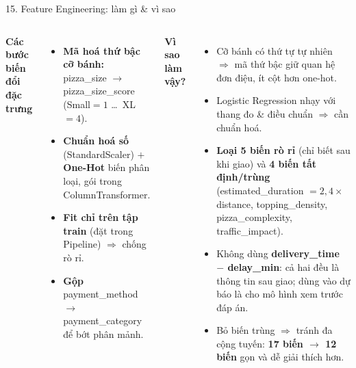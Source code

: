 \documentclass[t, aspectratio=169, 11pt]{beamer}
\newcommand{\blk}[1]{\textbf{\color{hustprimary}#1}}
\begin{document}
\begin{frame}{15. Feature Engineering: làm gì \& vì sao}
    \begin{columns}[T]
        \blk{Các bước biến đổi đặc trưng}
        \begin{itemize}\footnotesize
            \item \textbf{Mã hoá thứ bậc cỡ bánh:} pizza\_size $\to$ pizza\_size\_score (Small$=1$ \dots\ XL$=4$).
            \item \textbf{Chuẩn hoá số} (StandardScaler) $+$ \textbf{One-Hot} biến phân loại, gói trong ColumnTransformer.
            \item \textbf{Fit chỉ trên tập train} (đặt trong Pipeline) $\Rightarrow$ chống rò rỉ.
            \item \textbf{Gộp} payment\_method $\to$ payment\_category để bớt phân mảnh.
        \end{itemize}

        \blk{Vì sao làm vậy?}
        \begin{itemize}\footnotesize
            \item Cỡ bánh có thứ tự tự nhiên $\Rightarrow$ mã thứ bậc giữ quan hệ đơn điệu, ít cột hơn one-hot.
            \item Logistic Regression nhạy với thang đo \& điều chuẩn $\Rightarrow$ cần chuẩn hoá.
            \item \textbf{Loại 5 biến rò rỉ} (chỉ biết sau khi giao) và \textbf{4 biến tất định/trùng} (estimated\_duration $=2{,}4\times$distance, topping\_density, pizza\_complexity, traffic\_impact).
            \item Không dùng \textbf{delivery\_time $-$ delay\_min}: cả hai đều là thông tin sau giao; dùng vào dự báo là cho mô hình xem trước đáp án.
            \item Bỏ biến trùng $\Rightarrow$ tránh đa cộng tuyến: \textbf{17 biến $\to$ 12 biến} gọn và dễ giải thích hơn.
        \end{itemize}
    \end{columns}
\end{frame}
\end{document}
